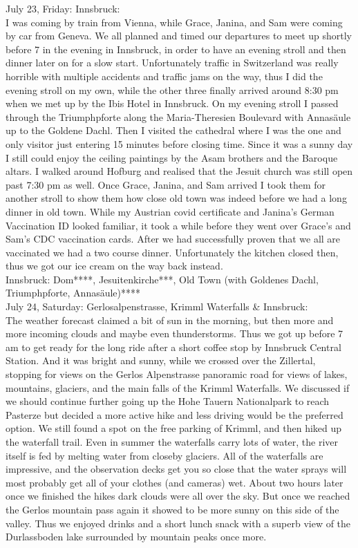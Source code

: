 {July 23, Friday: Innsbruck:\\
I was coming by train from Vienna, while Grace, Janina, and Sam were coming by car from Geneva. We all planned and timed our departures to meet up shortly before 7 in the evening in Innsbruck, in order to have an evening stroll and then dinner later on for a slow start.
Unfortunately traffic in Switzerland was really horrible with multiple accidents and traffic jams on the way, thus I did the evening stroll on my own, while the other three finally arrived around 8:30 pm when we met up by the Ibis Hotel in Innsbruck. On my evening stroll I passed through the Triumphpforte along the Maria-Theresien Boulevard with Annas\"aule up to the Goldene Dachl. Then I visited the cathedral where I was the one and only visitor just entering 15 minutes before closing time. Since it was a sunny day I still could enjoy the ceiling paintings by the Asam brothers and the Baroque altars. I walked around Hofburg and realised that the Jesuit church was still open past 7:30 pm as well. Once Grace, Janina, and Sam arrived I took them for another stroll to show them how close old town was indeed before we had a long dinner in old town. While my Austrian covid certificate and Janina's German Vaccination ID looked familiar, it took a while before they went over Grace's and Sam's CDC vaccination cards. After we had successfully proven that we all are vaccinated we had a two course dinner. Unfortunately the kitchen closed then, thus we got our ice cream on the way back instead.\\

Innsbruck: Dom****, Jesuitenkirche***, Old Town (with Goldenes Dachl, Triumphpforte, Annas\"aule)****\\

July 24, Saturday: Gerlosalpenstrasse, Krimml Waterfalls \& Innsbruck:\\
The weather forecast claimed a bit of sun in the morning, but then more and more incoming clouds and maybe even thunderstorms. Thus we got up before 7 am to get ready for the long ride after a short coffee stop by Innsbruck Central Station. And it was bright and sunny, while we crossed over the Zillertal, stopping for views on the Gerlos Alpenstrasse panoramic road for views of lakes, mountains, glaciers, and the main falls of the Krimml Waterfalls. We discussed if we should continue further going up the Hohe Tauern Nationalpark to reach Pasterze but decided a more active hike and less driving would be the preferred option. We still found a spot on the free parking of Krimml, and then hiked up the waterfall trail. Even in summer the waterfalls carry lots of water, the river itself is fed by melting water from closeby glaciers. All of the waterfalls are impressive, and the observation decks get you so close that the water sprays will most probably get all of your clothes (and cameras) wet. About two hours later once we finished the hikes dark clouds were all over the sky. But once we reached the Gerlos mountain pass again it showed to be more sunny on this side of the valley. Thus we enjoyed drinks and a short lunch snack with a superb view of the Durlassboden lake surrounded by mountain peaks once more.\\

}
